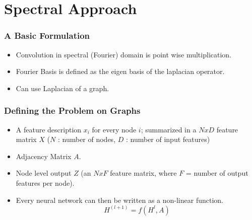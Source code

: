 \documentclass{beamer}
\begin{document}
\section{Spectral Approach}
\begin{frame}
  \frametitle{A Basic Formulation}
  \begin{itemize}
  \item Convolution in spectral (Fourier) domain is point wise multiplication.
  \item Fourier Basis is defined as the eigen basis of the laplacian operator.
  \item Can use Laplacian of a graph.
  \end{itemize}
\end{frame}

\begin{frame}
  \frametitle{Defining the Problem on Graphs}
  \begin{itemize}
  \item A feature description $x_i$ for every node $i$; summarized in a $N x D$ feature matrix $X$ ($N$ : number of nodes, $D$ : number of input features)
  \item Adjacency Matrix $A$.
  \item  Node level output $Z$ (an $N x F$ feature matrix, where $F$ = number of output features per node).
  \item  Every neural network can then be written as a non-linear function.
    $$H^{(l+1)} = f(H^{l}, A)$$
  \end{itemize}
\end{frame}
\end{document}
